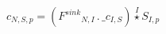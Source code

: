 \documentclass[border=2pt]{standalone}
\begin{document}
${c}{_{N, S, p}}=\left({{F^{sink}}}{_{N, I}} \, . \, {\_c}{_{I, S}}\right) \stackrel{I}{\star} {{S}}{_{I, p}}$
\end{document}

